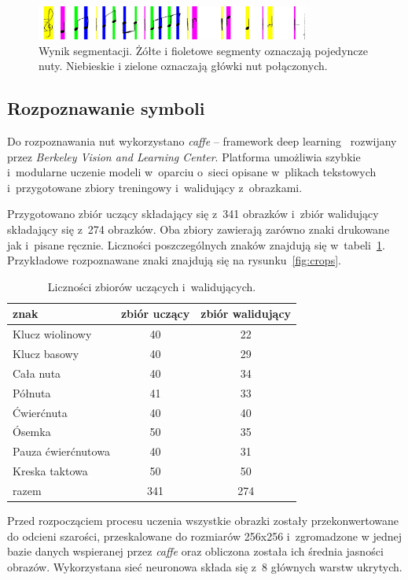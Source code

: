 \documentclass[a4paper,11pt]{article}
\begin{document}
\begin{figure}
\centering
\includegraphics[width=0.8\textwidth]{argb.jpg}
\caption{Wynik segmentacji. Żółte i fioletowe segmenty oznaczają pojedyncze nuty. Niebieskie i zielone oznaczają główki nut połączonych.}
\label{fig:argb}
\end{figure}


\subsection{Rozpoznawanie symboli}

Do rozpoznawania nut wykorzystano \emph{caffe} -- framework deep learning~\cite{jia2014caffe} rozwijany przez \emph{Berkeley Vision and Learning Center}. Platforma umożliwia szybkie i~modularne uczenie modeli w~oparciu o~sieci opisane w~plikach tekstowych i~przygotowane zbiory treningowy i~walidujący z~obrazkami.

Przygotowano zbiór uczący składający się z~341 obrazków i~zbiór walidujący składający się z~274 obrazków. Oba zbiory zawierają zarówno znaki drukowane jak i~pisane ręcznie. Liczności poszczególnych znaków znajdują się w~tabeli~\ref{tab:train_val}. Przykładowe rozpoznawane znaki znajdują się na rysunku~\ref{fig:crops}.

\begin{table}
\centering
\begin{tabular}{l|c|c}
znak & zbiór uczący & zbiór walidujący \\ \hline
Klucz wiolinowy & 40 & 22 \\
Klucz basowy & 40 & 29 \\
Cała nuta & 40 & 34 \\
Półnuta & 41 & 33 \\
Ćwierćnuta & 40 & 40 \\
Ósemka & 50 & 35 \\
Pauza ćwierćnutowa & 40 & 31 \\
Kreska taktowa & 50 & 50 \\ \hline
razem & 341 & 274 \\
\end{tabular}
\caption{Liczności zbiorów uczących i~walidujących.}
\label{tab:train_val}
\end{table}

Przed rozpocząciem procesu uczenia wszystkie obrazki zostały przekonwertowane do odcieni szarości, przeskalowane do rozmiarów 256x256 i~zgromadzone w jednej bazie danych wspieranej przez \emph{caffe} oraz obliczona została ich średnia jasności obrazów. Wykorzystana sieć neuronowa składa się z~8 głównych warstw ukrytych.
\end{document}
